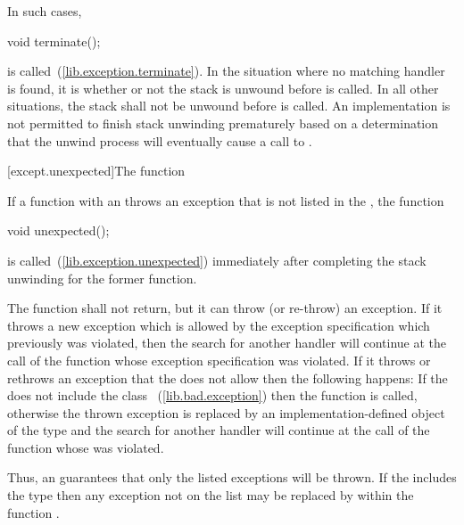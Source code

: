 \pnum
{}%
In such cases,

\begin{codeblock}
void terminate();
\end{codeblock}

is called~(\ref{lib.exception.terminate}).
In the situation where no matching handler is found, it is
 whether or not the
stack is unwound
before
is called.
In all other situations, the stack shall not be unwound before
is called.
An implementation is not permitted to finish stack unwinding
prematurely based on a determination that the unwind process
will eventually cause a call to
.

[except.unexpected]{The  function}

\pnum
{}%
If a function with
an 
throws an exception that is not listed in the
,
the function
\begin{codeblock}
void unexpected();
\end{codeblock}
is called~(\ref{lib.exception.unexpected}) immediately after completing
the stack unwinding for the former function.

\pnum
The
function shall not return, but it can throw (or re-throw) an exception.
If it throws a new exception which is allowed by the exception specification
which previously was violated, then the search for another handler
will continue at the call of the function whose exception specification was violated.
If it throws or rethrows an exception that the
does not allow
then the following happens:
%
If the
does not include the class
~(\ref{lib.bad.exception})
then the function
is called, otherwise the thrown exception is replaced by an
implementation-defined object of the type
and the search for another handler will continue at the call of the function
whose
was violated.

\pnum
Thus,
an 
guarantees that only the listed exceptions will be thrown.
If the
includes the type
then any exception not on the list may be replaced by
within the function
.

